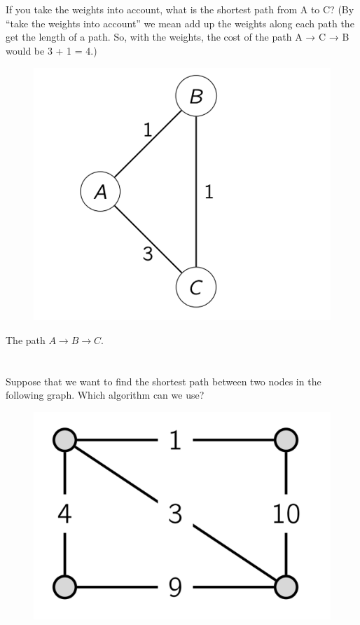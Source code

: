 \documentclass [12pt]{article}
\begin{document}
\section{} If you take the weights into account, what is the shortest path from A to C? (By ``take the weights into account'' we mean add up the weights along each path the get the length of a path. So, with the weights, the cost of the path A → C → B would be 3 + 1 = 4.)
\begin{figure}[H]
    \centering
    \includegraphics[scale=0.5]{7.png} 
    \label{fig:my_label}
\end{figure}

\begin{Solution}
The path $A \to B \to C$.
\end{Solution}


\section{} Suppose that we want to find the shortest path between two nodes in the following graph. Which algorithm can we use?
\begin{figure}[H]
    \centering
    \includegraphics[scale=0.5]{8.png} 
    \label{fig:my_label}
\end{figure}
\end{document}
